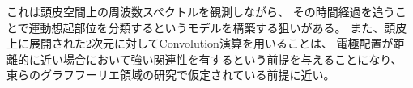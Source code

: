 これは頭皮空間上の周波数スペクトルを観測しながら、
その時間経過を追うことで運動想起部位を分類するというモデルを構築する狙いがある。
また、頭皮上に展開された2次元に対してConvolution演算を用いることは、
電極配置が距離的に近い場合において強い関連性を有するという前提を与えることになり、
東らのグラフフーリエ領域\cite{グラフフーリエ}の研究で仮定されている前提に近い。
